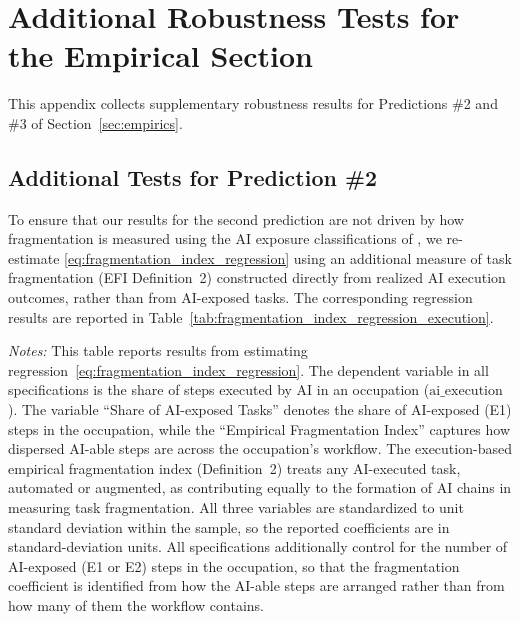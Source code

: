 \section{Additional Robustness Tests for the Empirical Section}
\label{app:additional_robustness}

This appendix collects supplementary robustness results for Predictions \#2 and \#3 of Section~\ref{sec:empirics}.


\subsection{Additional Tests for Prediction \#2}
\label{app:additional_robustness_pred2}
To ensure that our results for the second prediction are not driven by how fragmentation is measured using the AI exposure classifications of \citet{eloundou2023gpts}, we re-estimate \eqref{eq:fragmentation_index_regression} using an additional measure of task fragmentation (EFI Definition~2) constructed directly from realized AI execution outcomes, rather than from AI-exposed tasks.
The corresponding regression results are reported in Table~\ref{tab:fragmentation_index_regression_execution}.

\begin{table}[ht!]
    \caption{Role of AI-able Task Fragmentation in Determining AI Execution Outcomes (Execution-Based Empirical Fragmentation Measure)}
    \label{tab:fragmentation_index_regression_execution}
    \begin{center}
    
    \end{center}
    \raggedright \footnotesize{\emph{Notes:}} This table reports results from estimating regression~\eqref{eq:fragmentation_index_regression}.
    The dependent variable in all specifications is the share of steps executed by AI in an occupation ($\text{ai\_execution}$).
    The variable ``Share of AI-exposed Tasks'' denotes the share of AI-exposed (E1) steps in the occupation, while the ``Empirical Fragmentation Index'' captures how dispersed AI-able steps are across the occupation's workflow.
    The execution-based empirical fragmentation index (Definition~2) treats any AI-executed task, automated or augmented, as contributing equally to the formation of AI chains in measuring task fragmentation.
    All three variables are standardized to unit standard deviation within the sample, so the reported coefficients are in standard-deviation units. All specifications additionally control for the number of AI-exposed (E1 or E2) steps in the occupation, so that the fragmentation coefficient is identified from how the AI-able steps are arranged rather than from how many of them the workflow contains.
\end{table}

